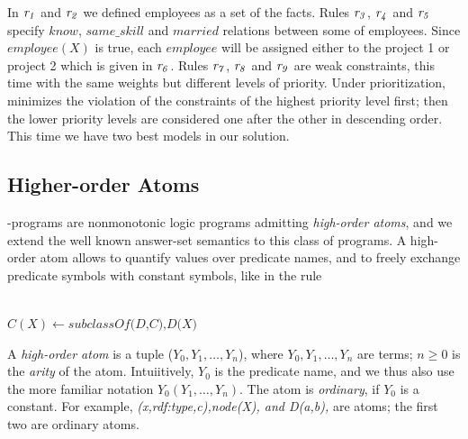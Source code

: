 \documentclass[a4paper, titlepage]{article}
\newcommand{\row}[1]{%
  \ensuremath{\it \color{black} #1 \color{black}}%
}
\begin{document}
In $\row{r_1}$ and $\row{r_2}$ we defined employees as a set of the 
facts. Rules $\row{r_3}$, $\row{r_4}$ and $\row{r_5}$ specify $\mathit{know}$, 
$\mathit{same\_skill}$ and $\mathit{married}$ relations 
between some of employees. Since $\mathit{employee}(X)$ is 
true, each $\mathit{employee}$ will be assigned either to 
the project 1 or project 2 which is given in $\row{r_6}$. Rules $\row{r_7}$, $\row{r_8}$ and $\row{r_9}$ 
are weak constraints, this time with the 
same weights but different levels of priority. Under 
prioritization, \dlvhex{} minimizes the violation of 
the constraints of the highest priority level first; then 
the lower priority levels are considered one after the 
other in descending order. This time we have two best 
models in our solution.     


\subsection{Higher-order Atoms}
\hex{}-programs are 
nonmonotonic logic programs admitting \emph{high-order 
atoms}, and we extend the well known answer-set semantics 
to this class of programs. A high-order 
atom allows to quantify values over predicate names, and to 
freely exchange predicate symbols with constant symbols, 
like in the rule\\ \centerline{\\$C(X) \leftarrow 
\textit{subclassOf(D,C),D(X)}$}
A \textit{high-order atom} is a tuple ($Y_0, Y_1,
\dots,Y_n$), where $Y_0, Y_1,\dots,Y_n$ are terms; $ n \ge 
0$ is the \textit{arity} of the atom. Intuiitively, $Y_0$ 
is the predicate name, and we thus also use the more 
familiar notation $Y_0(Y_1,\dots,Y_n)$. The atom is 
\textit{ordinary}, if $Y_0$ is a constant. For example, 
\textit{(x,rdf:type,c),node(X), and D(a,b),} are atoms; the 
first two are ordinary atoms.
\end{document}
